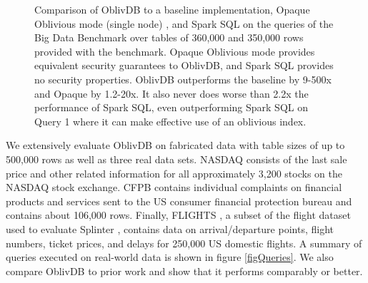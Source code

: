 \documentclass[conference]{IEEEtran}
\def\name/{OblivDB}
\begin{document}
\begin{figure}
\caption{Comparison of \name/ to a baseline implementation, Opaque Oblivious mode (single node) \cite{ZDB+17}, and Spark SQL \cite{SparkSQL} on the queries of the Big Data Benchmark \cite{BDB} over tables of 360,000 and 350,000 rows provided with the benchmark. Opaque Oblivious mode provides equivalent security guarantees to \name/, and Spark SQL provides no security properties. \name/ outperforms the baseline by 9-500x and Opaque by 1.2-20x. It also never does worse than 2.2x the performance of Spark SQL, even outperforming Spark SQL on Query 1 where it can make effective use of an oblivious index.} 
\label{figOpaque}
\end{figure}
We extensively evaluate \name/ on fabricated data with table sizes of up to 500,000 rows as well as three real data sets. NASDAQ \cite{NASDAQ} consists of the last sale price and other related information for all approximately 3,200 stocks on the NASDAQ stock exchange. CFPB \cite{CFPB} contains individual complaints on financial products and services sent to the US consumer financial protection bureau and contains about 106,000 rows. Finally, FLIGHTS \cite{FLIGHT}, a subset of the flight dataset used to evaluate Splinter \cite{WYG+17}, contains data on arrival/departure points, flight numbers, ticket prices, and delays for 250,000 US domestic flights. A summary of queries executed on real-world data is shown in figure \ref{figQueries}. We also compare \name/ to prior work and show that it performs comparably or better. 
\end{document}
